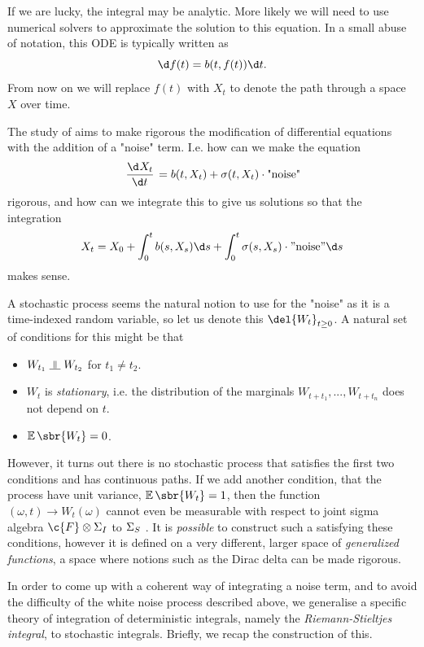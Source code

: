 If we are lucky, the integral may be analytic.
More likely we will need to use numerical solvers to approximate the solution to this equation.
In a small abuse of notation, this ODE is typically written as \[\d f(t) = b(t, f(t))\d t.\]
From now on we will replace \(f(t)\) with \(X_t\) to denote the path through a space \(X\) over time.

The study of  aims to make rigorous the modification of differential equations with the addition of a "noise" term.
I.e. how can we make the equation \[\od{X_t}{t} = b(t, X_t) + \sigma(t, X_t) \cdot \text{"noise"}\] rigorous, and how can we integrate this to give us solutions so that the integration \[ X_t = X_0 + \int_0^t b(s, X_s) \d s + \int_0^t \sigma(s, X_s) \cdot "\text{noise}" \d s\] makes sense.

A stochastic process seems the natural notion to use for the "noise" as it is a time-indexed random variable, so let us denote this \(\del{W_t}_{t\geq 0}\).
A natural set of conditions for this might be that \begin{itemize} \item \(W_{t_1} \indep W_{t_2}\) for \(t_1 \neq t_2\).
	\item \(W_t\) is \emph{stationary}, i.e. the distribution of the marginals \(W_{t+t_1}, ..., W_{t+t_n}\) does not depend on \(t\).
	\item \(\E\sbr{W_t}=0\).
\end{itemize}
However, it turns out there is no stochastic process that satisfies the first two conditions and has continuous paths.
If we add another condition, that the process have unit variance, \(\E\sbr{W_t} = 1\), then the function \((\omega, t) \to W_t(\omega)\) cannot even be measurable with respect to joint sigma algebra \(\c{F} \otimes \sigalg{I}\) to \(\Sigma_{S}\) \cite[p.
	180]{Kallianpur1980}.
It is \emph{possible} to construct such a  satisfying these conditions, however it is defined on a very different, larger space of \emph{generalized functions}, a space where notions such as the Dirac delta can be made rigorous.

In order to come up with a coherent way of integrating a noise term, and to avoid the difficulty of the white noise process described above, we generalise a specific theory of integration of deterministic integrals, namely the \emph{Riemann-Stieltjes integral}, to stochastic integrals.
Briefly, we recap the construction of this.


